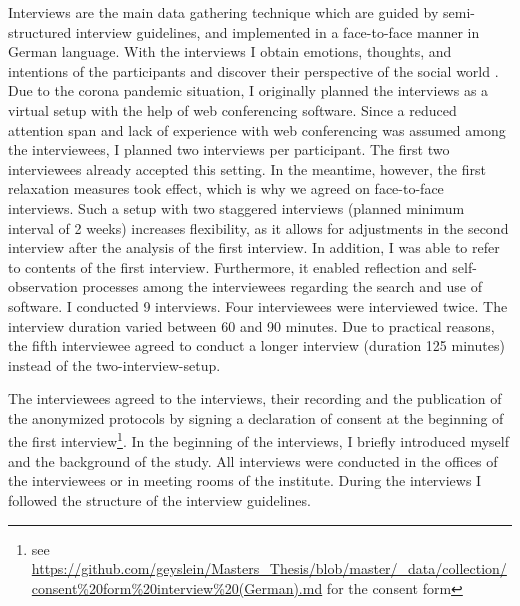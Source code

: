 \documentclass[12pt,a4paper,titlepage,oneside,abstract=true,toc=listof,toc=bibliography]{scrreprt}
\begin{document}
Interviews are the main data gathering technique which are guided by semi-structured interview guidelines, and implemented in a face-to-face manner \citep{Bryman2004} in German language. With the interviews I obtain emotions, thoughts, and intentions of the participants and discover their perspective of the social world \citep{Patton2002}. Due to the corona pandemic situation, I originally planned the interviews as a virtual setup with the help of web conferencing software. Since a reduced attention span and lack of experience with web conferencing was assumed among the interviewees, I planned two interviews per participant. The first two interviewees already accepted this setting. In the meantime, however, the first relaxation measures took effect, which is why we agreed on face-to-face interviews. Such a setup with two staggered interviews (planned minimum interval of 2 weeks) increases flexibility, as it allows for adjustments in the second interview after the analysis of the first interview. In addition, I was able to refer to contents of the first interview. Furthermore, it enabled reflection and self-observation processes among the interviewees regarding the search and use of software. I conducted 9 interviews. Four interviewees were interviewed twice. The interview duration varied between 60 and 90 minutes. Due to practical reasons, the fifth interviewee agreed to conduct a longer interview (duration 125 minutes) instead of the two-interview-setup.

The interviewees agreed to the interviews, their recording and the publication of the anonymized protocols by signing a declaration of consent at the beginning of the first interview\footnote{see \url{https://github.com/geyslein/Masters_Thesis/blob/master/_data/collection/consent\%20form\%20interview\%20(German).md} for the consent form}. In the beginning of the interviews, I briefly introduced myself and the background of the study. All interviews were conducted in the offices of the interviewees or in meeting rooms of the institute. During the interviews I followed the structure of the interview guidelines.
\end{document}
